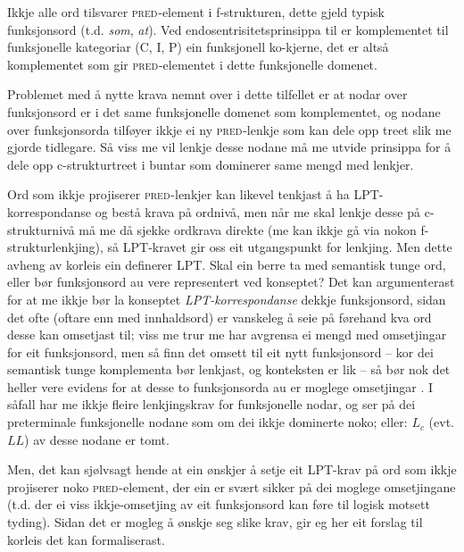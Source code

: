 \documentclass[12pt,a4paper,oneside,draft]{report}
\newcommand{\F}[2]{\textsc{#1}\ensuremath{_{#2}}}
\newcommand{\PRED}{\F{pred}{}}
\begin{document}
\label{SEC:fnord}

Ikkje alle ord tilsvarer \PRED{}-element i f-strukturen, dette gjeld
 typisk funksjonsord (t.d. \emph{som}, \emph{at}). Ved endosentrisitetsprinsippa
 til \citet{bresnan2001lfs} er komplementet til funksjonelle
 kategoriar (C, I, P) ein funksjonell ko-kjerne, det er altså
 komplementet som gir \PRED{}-elementet i dette funksjonelle domenet.

Problemet med å nytte krava nemnt over i dette tilfellet er at nodar
 over funksjonsord er i det same funksjonelle domenet som
 komplementet, og nodane over funksjonsorda tilføyer ikkje ei ny
 \PRED{}-lenkje som kan dele opp treet slik me gjorde tidlegare. Så
 viss me vil lenkje desse nodane må me utvide prinsippa for å dele opp
 c-strukturtreet i buntar som dominerer same mengd med lenkjer.

Ord som ikkje projiserer \PRED{}-lenkjer kan likevel tenkjast å ha
 LPT-korrespondanse og bestå krava på ordnivå, men når me skal lenkje
 desse på c-strukturnivå må me då sjekke ordkrava direkte (me kan
 ikkje gå via nokon f-strukturlenkjing), så LPT-kravet gir oss eit
 utgangspunkt for lenkjing. Men dette avheng av korleis ein definerer
 LPT. Skal ein berre ta med semantisk tunge ord, eller bør
 funksjonsord au vere representert ved konseptet? Det kan
 argumenterast for at me ikkje bør la konseptet \emph{LPT-korrespondanse}
 dekkje funksjonsord, sidan det ofte (oftare enn med innhaldsord) er
 vanskeleg å seie på førehand kva ord desse kan omsetjast til; viss me
 trur me har avgrensa ei mengd med omsetjingar for eit funksjonsord,
 men så finn det omsett til eit nytt funksjonsord -- kor dei semantisk
 tunge komplementa bør lenkjast, og konteksten er lik -- så bør nok
 det heller vere evidens for at desse to funksjonsorda au er moglege
 omsetjingar \citep{dyvik2010pc}.  I såfall har me ikkje fleire
 lenkjingskrav for funksjonelle nodar, og ser på dei preterminale
 funksjonelle nodane som om dei ikkje dominerte noko; eller: $L_c$
 (evt. $LL$) av desse nodane er tomt.

Men, det kan sjølvsagt hende at ein ønskjer å setje eit LPT-krav på
 ord som ikkje projiserer noko \PRED{}-element, der ein er svært
 sikker på dei moglege omsetjingane (t.d. der ei viss ikkje-omsetjing
 av eit funksjonsord kan føre til logisk motsett tyding). Sidan det er
 mogleg å ønskje seg slike krav, gir eg her eit forslag til korleis
 det kan formaliserast.
\end{document}
